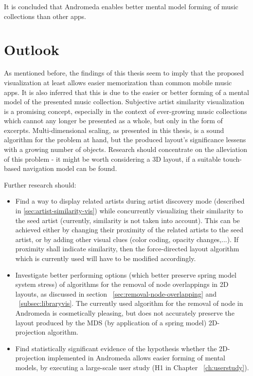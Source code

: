  It is concluded that Andromeda enables better mental model forming of music collections than other apps.

\section{Outlook}

As mentioned before, the findings of this thesis seem to imply that the proposed visualization at least allows easier memorization than common mobile music apps. It is also inferred that this is due to the easier or better forming of a mental model of the presented music collection. Subjective artist similarity visualization is a promising concept, especially in the context of ever-growing music collections which cannot any longer be presented as a whole, but only in the form of excerpts. Multi-dimensional scaling, as presented in this thesis, is a sound algorithm for the problem at hand, but the produced layout's significance lessens with a growing number of objects. Research should concentrate on the alleviation of this problem - it might be worth considering a 3D layout, if a suitable touch-based navigation model can be found.

Further research should:
\begin{itemize}
  \item Find a way to display related artists during artist discovery mode (described in \ref{sec:artist-similarity-vis}) while concurrently visualizing their similarity to the seed artist (currently, similarity is not taken into account). This can be achieved either by changing their proximity of the related artists to the seed artist, or by adding other visual clues (color coding, opacity changes,...). If proximity shall indicate similarity, then the force-directed layout algorithm which is currently used will have to be modified accordingly.

  \item Investigate better performing options (which better preserve spring model system stress) of algorithms for the removal of node overlappings in 2D layouts, as discussed in section ~\ref{sec:removal-node-overlapping} and ~\ref{subsec:libraryvis}. The currently used algorithm for the removal of node in Andromeda is cosmetically pleasing, but does not accurately preserve the layout produced by the MDS (by application of a spring model) 2D-projection algorithm.

  \item Find statistically significant evidence of the hypothesis whether the 2D-projection implemented in Andromeda allows easier forming of mental models, by executing a large-scale user study (H1 in Chapter ~\ref{ch:userstudy}).
\end{itemize}
